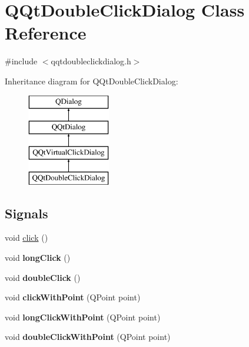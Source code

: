 \hypertarget{class_q_qt_double_click_dialog}{}\section{Q\+Qt\+Double\+Click\+Dialog Class Reference}
\label{class_q_qt_double_click_dialog}


{\ttfamily \#include $<$qqtdoubleclickdialog.\+h$>$}

Inheritance diagram for Q\+Qt\+Double\+Click\+Dialog\+:\begin{figure}[H]
\begin{center}
\leavevmode
\includegraphics[height=4.000000cm]{class_q_qt_double_click_dialog}
\end{center}
\end{figure}
\subsection*{Signals}
\begin{DoxyCompactItemize}
\item 
void \mbox{\hyperlink{class_q_qt_double_click_dialog_a3461712a18712567e94b8bdf35af3f98}{click}} ()
\item 
\mbox{\label{class_q_qt_double_click_dialog_a11fd845f5b05c50da39a5db227e456a5}} 
void {\bfseries long\+Click} ()
\item 
\mbox{\label{class_q_qt_double_click_dialog_a99f23cfe78e1e1153a229881517b0e3e}} 
void {\bfseries double\+Click} ()
\item 
\mbox{\label{class_q_qt_double_click_dialog_add60aa47ed406f3baead5131070d6fbf}} 
void {\bfseries click\+With\+Point} (Q\+Point point)
\item 
\mbox{\label{class_q_qt_double_click_dialog_a21f473bb4549888d3ced7f3cb9806d43}} 
void {\bfseries long\+Click\+With\+Point} (Q\+Point point)
\item 
\mbox{\label{class_q_qt_double_click_dialog_aa24c9d9473adc139d723865e5e7f759c}} 
void {\bfseries double\+Click\+With\+Point} (Q\+Point point)
\end{DoxyCompactItemize}
